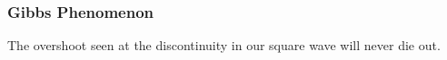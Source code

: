 \documentclass{beamer}
\begin{document}
\begin{frame}
   \frametitle{Gibbs Phenomenon}
   \begin{block}{}
   The overshoot seen at the discontinuity in our square wave will never die out.
   \end{block}
\end{frame}
\end{document}
